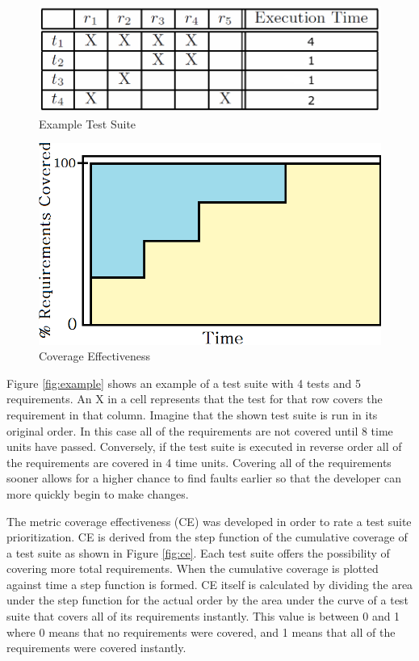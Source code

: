\documentclass{vgtc}                          %
\begin{document}
\begin{figure}[t]
\centering
\includegraphics[scale=.2]{CoverageMatrix}
\caption{Example Test Suite}
\end{figure}
\label{fig:example}

\begin{figure}[ht]
\centering
\includegraphics[scale=.2]{ce}
\caption{Coverage Effectiveness}
\end{figure}
\label{fig:ce}

Figure \ref{fig:example} shows an example of a test suite with 4 tests and 5 requirements.  An X in a cell represents that the test for that row covers the requirement in that column.  Imagine that the shown test suite is run in its original order.  In this case all of the requirements are not covered until 8 time units have passed.  Conversely, if the test suite is executed in reverse order all of the requirements are covered in 4 time units.  Covering all of the requirements sooner allows for a higher chance to find faults earlier so that the developer can more quickly begin to make changes.  

The metric coverage effectiveness (CE) \cite{ce} was developed in order to rate a test suite prioritization.  CE is derived from the step function of the cumulative coverage of a test suite as shown in Figure \ref{fig:ce}.  Each test suite offers the possibility of covering more total requirements.  When the cumulative coverage is plotted against time a step function is formed.  CE itself is calculated by dividing the area under the step function for the actual order by the area under the curve of a test suite that covers all of its requirements instantly.  This value is between 0 and 1 where 0 means that no requirements were covered, and 1 means that all of the requirements were covered instantly.
\end{document}
